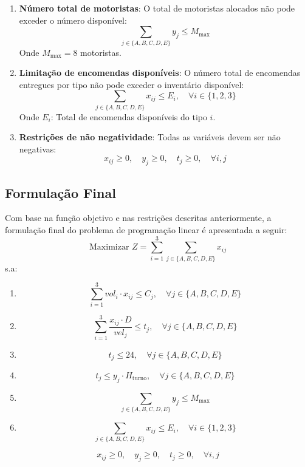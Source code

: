 \begin{enumerate}
\begin{itemize}
    \end{itemize}
    \item \textbf{Número total de motoristas}: O total de motoristas alocados não pode exceder o número disponível:
    \[
        \sum_{j \in \{A, B, C, D, E\}} y_j \leq M_{\text{max}}
    \]
    Onde \( M_{\text{max}} = 8 \) motoristas.
    \item \textbf{Limitação de encomendas disponíveis}: O número total de encomendas entregues por tipo não pode exceder o inventário disponível:
    \[
        \sum_{j \in \{A, B, C, D, E\}} x_{ij} \leq E_i, \quad \forall i \in \{1, 2, 3\}
    \]
    Onde \( E_i \): Total de encomendas disponíveis do tipo \( i \).
    \item \textbf{Restrições de não negatividade}: Todas as variáveis devem ser não negativas:
    \[
        x_{ij} \geq 0, \quad y_j \geq 0, \quad t_j \geq 0, \quad \forall i, j
    \]
\end{enumerate}

\subsection{Formulação Final}\label{subsec:formulacao-final}
Com base na função objetivo e nas restrições descritas anteriormente, a formulação final do problema de programação linear é apresentada a seguir:
\[
    \text{Maximizar } Z = \sum_{i=1}^{3} \sum_{j \in \{A, B, C, D, E\}} x_{ij}
\]
s.a:
\begin{enumerate}
    \item \[
              \sum_{i=1}^{3} vol_i \cdot x_{ij} \leq C_j, \quad \forall j \in \{A, B, C, D, E\}
    \]
    \item \[
              \sum_{i=1}^{3} \frac{x_{ij} \cdot D}{vel_j} \leq t_j, \quad \forall j \in \{A, B, C, D, E\}
    \]
    \item \[
              t_j \leq 24, \quad \forall j \in \{A, B, C, D, E\}
    \]
    \item \[
              t_j \leq y_j \cdot H_{\text{turno}}, \quad \forall j \in \{A, B, C, D, E\}
    \]
    \item \[
              \sum_{j \in \{A, B, C, D, E\}} y_j \leq M_{\max}
    \]
    \item \[
              \sum_{j \in \{A, B, C, D, E\}} x_{ij} \leq E_i, \quad \forall i \in \{1, 2, 3\}
    \]
\end{enumerate}
\[
    x_{ij} \geq 0, \quad y_j \geq 0, \quad t_j \geq 0, \quad \forall i, j
\]